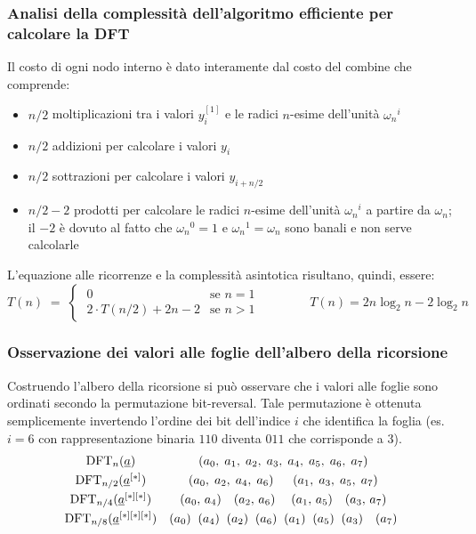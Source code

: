 \subsubsection*{Analisi della complessità dell'algoritmo efficiente per calcolare la DFT}
Il costo di ogni nodo interno è dato interamente dal costo del combine che comprende:
\begin{itemize}
	\item \(n/2\) moltiplicazioni tra i valori \(y_i^{[1]}\) e le radici \(n\)-esime dell'unità \({\omega_n}^i\)
	\item \(n/2\) addizioni per calcolare i valori \(y_i\)
	\item \(n/2\) sottrazioni per calcolare i valori \(y_{i + n/2}\)
	\item \(n/2 - 2\) prodotti per calcolare le radici \(n\)-esime dell'unità \({\omega_n}^i\) a partire da \(\omega_n\);
	il \(-2\) è dovuto al fatto che \({\omega_n}^0 = 1\) e \({\omega_n}^1 = \omega_n\) sono banali e non serve calcolarle
\end{itemize}
L'equazione alle ricorrenze e la complessità asintotica risultano, quindi, essere:
\[T(n) \; = \; \begin{cases}
	\; 0 & \text{se } n = 1 \\[3pt]
	\; 2 \cdot T(n/2) + 2n - 2 & \text{se } n > 1
\end{cases} \qquad\qquad T(n) = 2 n \log_2 n - 2 \log_2 n\]

\subsubsection*{Osservazione dei valori alle foglie dell'albero della ricorsione}
Costruendo l'albero della ricorsione si può osservare che i valori alle foglie sono ordinati secondo la permutazione
bit-reversal. Tale permutazione è ottenuta semplicemente invertendo l'ordine dei bit dell'indice \(i\) che identifica la foglia (es. \(i = 6\)
con rappresentazione binaria \(110\) diventa \(011\) che corrisponde a \(3\)).
\[\begin{array}{c c}
	\text{DFT}_{n}(\underline{a}) & (a_0, \; a_1, \; a_2, \; a_3, \; a_4, \; a_5, \; a_6, \; a_7) \\[3pt]
	\text{DFT}_{n/2}(\underline{a}^{[*]}) & (a_0, \; a_2, \; a_4, \; a_6) \quad\;\; (a_1, \; a_3, \; a_5, \; a_7) \\[3pt]
	\text{DFT}_{n/4}(\underline{a}^{[*][*]}) & (a_0, \, a_4) \quad (a_2, \, a_6) \quad\; (a_1, \, a_5) \quad (a_3, \, a_7) \\[3pt]
	\text{DFT}_{n/8}(\underline{a}^{[*][*][*]}) & (a_0) \;\; (a_4) \;\; (a_2) \;\; (a_6) \;\; (a_1) \;\; (a_5) \;\; (a_3) \quad (a_7)
\end{array}\]

